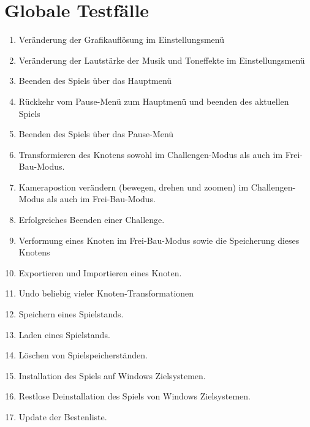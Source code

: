 \chapter{Globale Testfälle}

\renewcommand{\theenumi}{/T\_\arabic{enumi}0/}
\renewcommand{\labelenumi}{\theenumi}

\begin{enumerate}
\item Veränderung der Grafikauflösung  im Einstellungsmenü 
\item Veränderung der Lautstärke der Musik und Toneffekte im Einstellungsmenü  
\item Beenden des Spiels über das Hauptmenü 
\item Rückkehr vom Pause-Menü zum Hauptmenü und beenden des aktuellen Spiels 
\item Beenden des Spiels über das Pause-Menü 
\item Transformieren des Knotens sowohl im Challengen-Modus als auch im Frei-Bau-Modus. 
\item Kamerapostion verändern (bewegen, drehen und zoomen) im Challengen-Modus als auch im Frei-Bau-Modus. 
\item Erfolgreiches Beenden einer Challenge. 
\item Verformung eines Knoten im Frei-Bau-Modus sowie die Speicherung dieses Knotens 
\item Exportieren und Importieren eines Knoten. 
\item Undo beliebig vieler Knoten-Transformationen 
\item Speichern eines Spielstands.
\item Laden eines Spielstands.
\item Löschen von Spielspeicherständen.
\item Installation des Spiels auf Windows Zielsystemen.
\item Restlose Deinstallation des Spiels von Windows Zielsystemen.
\item Update der Bestenliste.

\end{enumerate}
